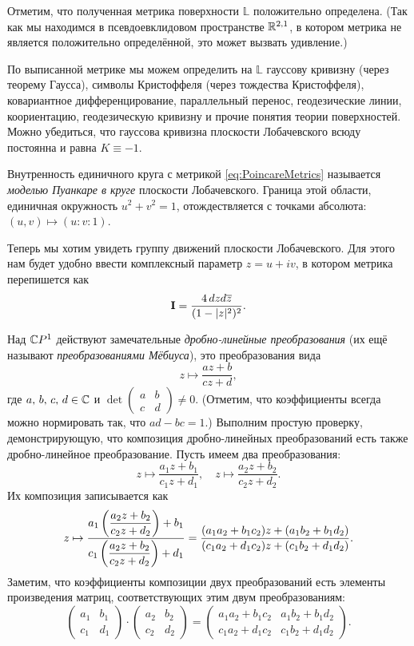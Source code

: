 Отметим, что полученная метрика поверхности $\mathbb{L}$ положительно определена. (Так как мы находимся в псевдоевклидовом пространстве $\mathbb{R}^{2, 1}$, в котором метрика не является положительно определённой, это может вызвать удивление.)

По выписанной метрике мы можем определить на $\mathbb{L}$ гауссову кривизну (через теорему Гаусса), символы Кристоффеля (через тождества Кристоффеля), ковариантное дифференцирование, параллельный перенос, геодезические линии, коориентацию, геодезическую кривизну и прочие понятия теории поверхностей. Можно убедиться, что гауссова кривизна плоскости Лобачевского всюду постоянна и равна $K \equiv -1$.

Внутренность единичного круга с метрикой \eqref{eq:PoincareMetrics} называется \textit{моделью Пуанкаре в круге} плоскости Лобачевского. Граница этой области, единичная окружность $u^2 + v^2 = 1$, отождествляется с точками абсолюта: $(u, v) \mapsto (u : v : 1)$.

Теперь мы хотим увидеть группу движений плоскости Лобачевского. Для этого нам будет удобно ввести комплексный параметр $z = u + iv$, в котором метрика перепишется как
\begin{equation} \label{eq:zMetrics}
	\boldsymbol{\operatorname{I}} = \frac{4\,dzd\overline{z}}{(1 - |z|^2)^2}.
\end{equation}

Над $\mathbb{C} P^1$ действуют замечательные \textit{дробно-линейные преобразования} (их ещё называют \textit{преобразованиями Мёбиуса}), это преобразования вида
\[
	z \mapsto \frac{az + b}{cz + d},
\]
где $a,\,b,\,c,\,d \in \mathbb{C}$ и
$\det\begin{pmatrix}
	a & b\\
	c & d
\end{pmatrix} \ne 0$. (Отметим, что коэффициенты всегда можно нормировать так, что $ad - bc = 1$.) Выполним простую проверку, демонстрирующую, что композиция дробно-линейных преобразований есть также дробно-линейное преобразование. Пусть имеем два преобразования:
\[
	z \mapsto \frac{a_1z + b_1}{c_1z + d_1},\quad
	z \mapsto \frac{a_2z + b_2}{c_2z + d_2}.
\]
Их композиция записывается как
\[
	z \mapsto \frac{a_1\left(\dfrac{a_2z + b_2}{c_2z + d_2}\right) + b_1}{c_1\left(\dfrac{a_2z + b_2}{c_2z + d_2}\right) + d_1} = \frac{(a_1a_2 + b_1c_2)z + (a_1b_2 + b_1d_2)}{(c_1a_2 + d_1c_2)z + (c_1b_2 + d_1d_2)}.
\]
Заметим, что коэффициенты композиции двух преобразований есть элементы произведения матриц, соответствующих этим двум преобразованиям:
\[
	\begin{pmatrix}
		a_1 & b_1\\
		c_1 & d_1
	\end{pmatrix} \cdot
	\begin{pmatrix}
		a_2 & b_2\\
		c_2 & d_2
	\end{pmatrix} =
	\begin{pmatrix}
		a_1a_2 + b_1c_2 & a_1b_2 + b_1d_2\\
		c_1a_2 + d_1c_2 & c_1b_2 + d_1d_2
	\end{pmatrix}.
\]

